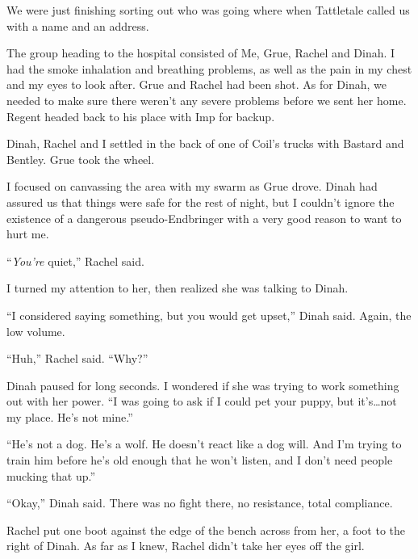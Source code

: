 \sectionbreak



We were just finishing sorting out who was going where when Tattletale called us with a name and an address.



The group heading to the hospital consisted of Me, Grue, Rachel and Dinah.  I had the smoke inhalation and breathing problems, as well as the pain in my chest and my eyes to look after.  Grue and Rachel had been shot.  As for Dinah, we needed to make sure there weren't any severe problems before we sent her home.  Regent headed back to his place with Imp for backup.



Dinah, Rachel and I settled in the back of one of Coil's trucks with Bastard and Bentley.  Grue took the wheel.



I focused on canvassing the area with my swarm as Grue drove.  Dinah had assured us that things were safe for the rest of night, but I couldn't ignore the existence of a dangerous pseudo-Endbringer with a very good reason to want to hurt me.



``\emph{You're} quiet,'' Rachel said.



I turned my attention to her, then realized she was talking to Dinah.



``I considered saying something, but you would get upset,'' Dinah said.  Again, the low volume.



``Huh,'' Rachel said.  ``Why?''



Dinah paused for long seconds.  I wondered if she was trying to work something out with her power.  ``I was going to ask if I could pet your puppy, but it's\ldots not my place.  He's not mine.''



``He's not a dog.  He's a wolf.  He doesn't react like a dog will.  And I'm trying to train him before he's old enough that he won't listen, and I don't need people mucking that up.''



``Okay,'' Dinah said.  There was no fight there, no resistance, total compliance.



Rachel put one boot against the edge of the bench across from her, a foot to the right of Dinah.  As far as I knew, Rachel didn't take her eyes off the girl.



